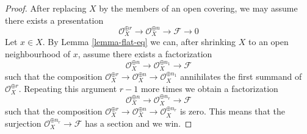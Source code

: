 \documentclass[10pt,a4paper]{amsart}
\theoremstyle{plain}
\theoremstyle{definition}
\theoremstyle{remark}
\numberwithin{equation}{subsection}
\begin{document}
\begin{proof}
After replacing $X$ by the members of an open covering, we may
assume there exists a presentation
$$
\mathcal{O}_X^{\oplus r} \to
\mathcal{O}_X^{\oplus n} \to \mathcal{F} \to 0
$$
Let $x \in X$. By Lemma \ref{lemma-flat-eq}
we can, after shrinking $X$ to an open
neighbourhood of $x$, assume there exists a factorization
$$
\mathcal{O}_X^{\oplus n} \to
\mathcal{O}_X^{\oplus n_1} \to \mathcal{F}
$$
such that the composition
$\mathcal{O}_X^{\oplus r} \to \mathcal{O}_X^{\oplus n} \to
\mathcal{O}_X^{\oplus n_1}$
annihilates the first summand of $\mathcal{O}_X^{\oplus r}$.
Repeating this argument $r - 1$ more times we obtain a factorization
$$
\mathcal{O}_X^{\oplus n} \to
\mathcal{O}_X^{\oplus n_r} \to \mathcal{F}
$$
such that the composition
$\mathcal{O}_X^{\oplus r} \to \mathcal{O}_X^{\oplus n}
\to \mathcal{O}_X^{\oplus n_r}$ is zero.
This means that the surjection $\mathcal{O}_X^{\oplus n_r} \to \mathcal{F}$
has a section and we win.
\end{proof}
\end{document}
